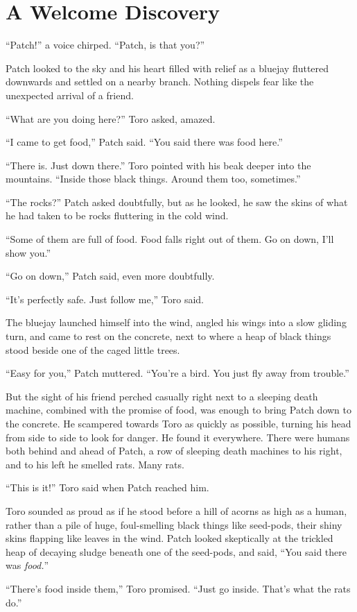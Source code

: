 \documentclass[ebook,oneside,openany,17pt]{memoir}
\renewcommand{\thechapter}{\Roman{chapter}}
\newcounter{sections}
\newcommand{\sections}[1]{%
  \section*{#1}
  \addtocounter{sections}{1}%
  \pdfbookmark[1]{#1}{section.\thechapter.\thesections}}
\begin{document}

\sections{A Welcome Discovery}

“Patch!” a voice chirped. “Patch, is that you?”

Patch looked to the sky and his heart filled with relief as a bluejay
fluttered downwards and settled on a nearby branch. Nothing dispels
fear like the unexpected arrival of a friend.

“What are you doing here?” Toro asked, amazed.

“I came to get food,” Patch said. “You said there was food here.”

“There is. Just down there.” Toro pointed with his beak deeper into
the mountains. “Inside those black things. Around them too,
sometimes.”

“The rocks?” Patch asked doubtfully, but as he looked, he saw the
skins of what he had taken to be rocks fluttering in the cold wind.

“Some of them are full of food. Food falls right out of them. Go on
down, I’ll show you.”

“Go on down,” Patch said, even more doubtfully.

“It’s perfectly safe. Just follow me,” Toro said.

The bluejay launched himself into the wind, angled his wings into a
slow gliding turn, and came to rest on the concrete, next to where a
heap of black things stood beside one of the caged little trees.

“Easy for you,” Patch muttered. “You’re a bird. You just fly away from
trouble.”

But the sight of his friend perched casually right next to a sleeping
death machine, combined with the promise of food, was enough to bring
Patch down to the concrete. He scampered towards Toro as quickly as
possible, turning his head from side to side to look for danger. He
found it everywhere. There were humans both behind and ahead of Patch,
a row of sleeping death machines to his right, and to his left he
smelled rats. Many rats.

“This is it!” Toro said when Patch reached him.

Toro sounded as proud as if he stood before a hill of acorns as high
as a human, rather than a pile of huge, foul-smelling black things
like seed-pods, their shiny skins flapping like leaves in the
wind. Patch looked skeptically at the trickled heap of decaying sludge
beneath one of the seed-pods, and said, “You said there was
\emph{food.}”

“There’s food inside them,” Toro promised. “Just go inside. That’s
what the rats do.”
\end{document}
